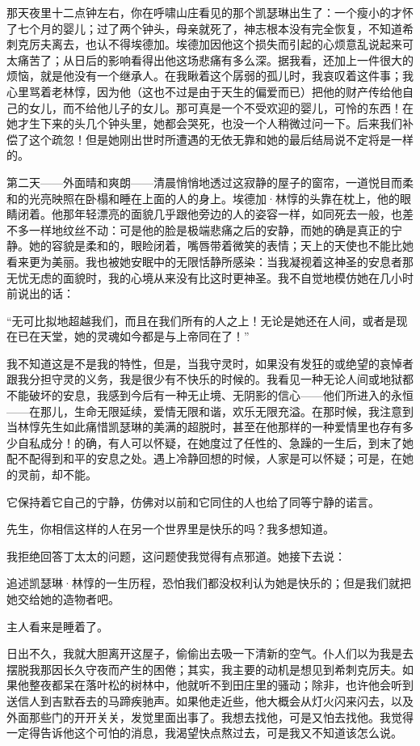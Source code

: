 \par 那天夜里十二点钟左右，你在呼啸山庄看见的那个凯瑟琳出生了：一个瘦小的才怀了七个月的婴儿；过了两个钟头，母亲就死了，神志根本没有完全恢复，不知道希刺克厉夫离去，也认不得埃德加。埃德加因他这个损失而引起的心烦意乱说起来可太痛苦了；从日后的影响看得出他这场悲痛有多么深。据我看，还加上一件很大的烦恼，就是他没有一个继承人。在我瞅着这个孱弱的孤儿时，我哀叹着这件事；我心里骂着老林惇，因为他（这也不过是由于天生的偏爱而已）把他的财产传给他自己的女儿，而不给他儿子的女儿。那可真是一个不受欢迎的婴儿，可怜的东西！在她才生下来的头几个钟头里，她都会哭死，也没一个人稍微过问一下。后来我们补偿了这个疏忽！但是她刚出世时所遭遇的无依无靠和她的最后结局说不定将是一样的。
\par 第二天——外面晴和爽朗——清晨悄悄地透过这寂静的屋子的窗帘，一道悦目而柔和的光亮映照在卧榻和睡在上面的人的身上。埃德加·林惇的头靠在枕上，他的眼睛闭着。他那年轻漂亮的面貌几乎跟他旁边的人的姿容一样，如同死去一般，也差不多一样地纹丝不动：可是他的脸是极端悲痛之后的安静，而她的确是真正的宁静。她的容貌是柔和的，眼睑闭着，嘴唇带着微笑的表情；天上的天使也不能比她看来更为美丽。我也被她安眠中的无限恬静所感染：当我凝视着这神圣的安息者那无忧无虑的面貌时，我的心境从来没有比这时更神圣。我不自觉地模仿她在几小时前说出的话：
\par “无可比拟地超越我们，而且在我们所有的人之上！无论是她还在人间，或者是现在已在天堂，她的灵魂如今都是与上帝同在了！”
\par 我不知道这是不是我的特性，但是，当我守灵时，如果没有发狂的或绝望的哀悼者跟我分担守灵的义务，我是很少有不快乐的时候的。我看见一种无论人间或地狱都不能破坏的安息，我感到今后有一种无止境、无阴影的信心——他们所进入的永恒——在那儿，生命无限延续，爱情无限和谐，欢乐无限充溢。在那时候，我注意到当林惇先生如此痛惜凯瑟琳的美满的超脱时，甚至在他那样的一种爱情里也存有多少自私成分！的确，有人可以怀疑，在她度过了任性的、急躁的一生后，到末了她配不配得到和平的安息之处。遇上冷静回想的时候，人家是可以怀疑；可是，在她的灵前，却不能。
\par 它保持着它自己的宁静，仿佛对以前和它同住的人也给了同等宁静的诺言。
\par 先生，你相信这样的人在另一个世界里是快乐的吗？我多想知道。
\par 我拒绝回答丁太太的问题，这问题使我觉得有点邪道。她接下去说：
\par 追述凯瑟琳·林惇的一生历程，恐怕我们都没权利认为她是快乐的；但是我们就把她交给她的造物者吧。
\par 主人看来是睡着了。
\par 日出不久，我就大胆离开这屋子，偷偷出去吸一下清新的空气。仆人们以为我是去摆脱我那因长久守夜而产生的困倦；其实，我主要的动机是想见到希刺克厉夫。如果他整夜都呆在落叶松的树林中，他就听不到田庄里的骚动；除非，也许他会听到送信人到吉默吞去的马蹄疾驰声。如果他走近些，他大概会从灯火闪来闪去，以及外面那些门的开开关关，发觉里面出事了。我想去找他，可是又怕去找他。我觉得一定得告诉他这个可怕的消息，我渴望快点熬过去，可是我又不知道该怎么说。
